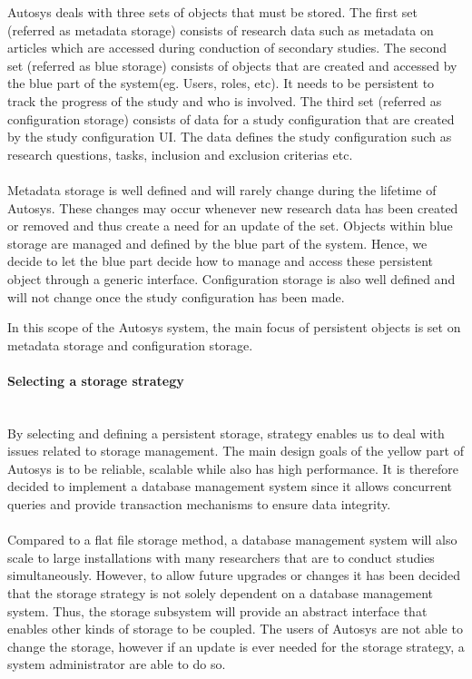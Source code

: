 Autosys deals with three sets of objects that must be stored.  The first set (referred as metadata storage) consists of research data such as metadata on articles which are accessed during conduction of secondary studies. The second set (referred as blue storage) consists of objects that are created and accessed by the blue part of the system(eg. Users, roles, etc). It needs to be persistent to track the progress of the study and who is involved. The third set (referred as configuration storage) consists of data for a study configuration that are created by the study configuration UI. The data defines the study configuration such as research questions, tasks, inclusion and exclusion criterias etc.\\\\ 

Metadata storage is well defined and will rarely change during the lifetime of Autosys. These changes may occur whenever new research data has been created or removed and thus create a need for an update of the set. Objects within blue storage are managed and defined by the blue part of the system. Hence, we decide to let the blue part decide how to manage and access these persistent object through a generic interface. Configuration storage is also well defined and will not change once the study configuration has been made.

In this scope of the Autosys system, the main focus of persistent objects is set on metadata storage and configuration storage.

\paragraph{Selecting a storage strategy}\mbox{}\\
By selecting and defining a persistent storage, strategy enables us to deal with issues related to storage management. The main design goals of the yellow part of Autosys is to be reliable, scalable while also has high performance. It is therefore decided to implement a database management system since it allows concurrent queries and provide transaction mechanisms to ensure data integrity. \\\\Compared to a flat file storage method, a database management system will also scale to large installations with many researchers that are to conduct studies simultaneously. However, to allow future upgrades or changes it has been decided that the storage strategy is not solely dependent on a database management system. Thus, the storage subsystem will provide an abstract interface that enables other kinds of storage to be coupled. The users of Autosys are not able to change the storage, however if an update is ever needed for the storage strategy, a system administrator are able to do so. 


